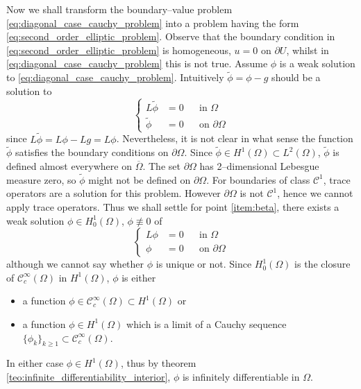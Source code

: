 Now we shall transform the boundary--value problem
\eqref{eq:diagonal_case_cauchy_problem} into a problem having the form
\eqref{eq:second_order_elliptic_problem}. Observe that the boundary condition in
\eqref{eq:second_order_elliptic_problem} is homogeneous, \ie $u = 0$ on
$\partial U$, whilst in \eqref{eq:diagonal_case_cauchy_problem} this is not
true. Assume $\phi$ is a weak solution to
\eqref{eq:diagonal_case_cauchy_problem}. Intuitively $\tilde{\phi} = \phi - g$ should be a solution to
\begin{equation} \label{eq:weak_solution_pde_4}
	\left\{
		\begin{aligned}
			L \tilde{\phi} &= 0 & &\text{in } \Omega \\
			\tilde{\phi} &= 0 	& &\text{on } \partial \Omega 
		\end{aligned}
	\right.
\end{equation}
since $L \tilde{\phi} = L \phi - L g = L \phi$. Nevertheless, it is not clear in
what sense the function $\tilde{\phi}$ satisfies the boundary conditions on
$\partial \Omega$. Since $\tilde{\phi} \in H^1(\Omega) \subset L^2(\Omega)$,
$\tilde{\phi}$ is defined almost everywhere on $\overline{\Omega}$. The set
$\partial \Omega$ has 2--dimensional Lebesgue measure zero, so $\tilde{\phi}$
might not be defined on $\partial \Omega$. For boundaries of class
$\mathcal{C}^1$, trace operators are a solution for this problem. However
$\partial \Omega$ is not $\mathcal{C}^1$, hence we cannot apply trace operators.
Thus we shall settle for point \ref{item:beta}, \ie there exists a weak
solution $\phi \in H_0^1(\Omega)$, $\phi \not\equiv 0$ of 
\begin{equation*}
	\left\{
		\begin{aligned}
			L \phi &= 0 & &\text{in } \Omega \\
			\phi &= 0 	& &\text{on } \partial \Omega
		\end{aligned}
	\right.
\end{equation*}
although we cannot say whether $\phi$ is unique or not. Since $H_0^1(\Omega)$ is
the closure of $\mathcal{C}_c^\infty(\Omega)$ in $H^1(\Omega)$, $\phi$ is either
\begin{itemize}[topsep=0pt]
	\item a function $\phi \in \mathcal{C}_c^\infty(\Omega) \subset H^1(\Omega)$ or
	\item a function $\phi \in H^1(\Omega)$ which is a limit of a Cauchy sequence
	$\{\phi_k \}_{k \geq 1} \subset \mathcal{C}_c^\infty(\Omega)$.
\end{itemize}
In either case $\phi \in H^1(\Omega)$, thus by theorem
\ref{teo:infinite_differentiability_interior}, $\phi$ is infinitely differentiable in $\Omega$.